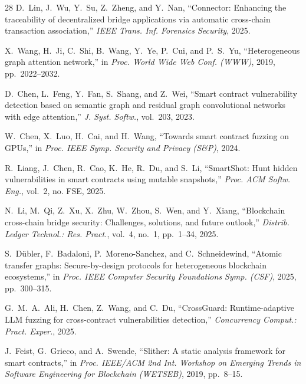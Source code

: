 \documentclass[journal]{IEEEtran}
\begin{document}
\begin{thebibliography}{28}
D.~Lin, J.~Wu, Y.~Su, Z.~Zheng, and Y.~Nan,
``Connector: Enhancing the traceability of decentralized bridge applications via automatic cross-chain transaction association,''
\textit{IEEE Trans. Inf. Forensics Security}, 2025.

X.~Wang, H.~Ji, C.~Shi, B.~Wang, Y.~Ye, P.~Cui, and P.~S.~Yu,
``Heterogeneous graph attention network,''
in \textit{Proc. World Wide Web Conf. (WWW)}, 2019, pp.~2022--2032.

D.~Chen, L.~Feng, Y.~Fan, S.~Shang, and Z.~Wei,
``Smart contract vulnerability detection based on semantic graph and residual graph convolutional networks with edge attention,''
\textit{J. Syst. Softw.}, vol.~203, 2023.

W.~Chen, X.~Luo, H.~Cai, and H.~Wang,
``Towards smart contract fuzzing on GPUs,''
in \textit{Proc. IEEE Symp. Security and Privacy (S\&P)}, 2024.

R.~Liang, J.~Chen, R.~Cao, K.~He, R.~Du, and S.~Li,
``SmartShot: Hunt hidden vulnerabilities in smart contracts using mutable snapshots,''
\textit{Proc. ACM Softw. Eng.}, vol.~2, no. FSE, 2025.

N.~Li, M.~Qi, Z.~Xu, X.~Zhu, W.~Zhou, S.~Wen, and Y.~Xiang,
``Blockchain cross-chain bridge security: Challenges, solutions, and future outlook,''
\textit{Distrib. Ledger Technol.: Res. Pract.}, vol.~4, no.~1, pp.~1--34, 2025.

S.~D\"ubler, F.~Badaloni, P.~Moreno-Sanchez, and C.~Schneidewind,
``Atomic transfer graphs: Secure-by-design protocols for heterogeneous blockchain ecosystems,''
in \textit{Proc. IEEE Computer Security Foundations Symp. (CSF)}, 2025, pp.~300--315.

G.~M.~A.~Ali, H.~Chen, Z.~Wang, and C.~Du,
``CrossGuard: Runtime-adaptive LLM fuzzing for cross-contract vulnerabilities detection,''
\textit{Concurrency Comput.: Pract. Exper.}, 2025.

J.~Feist, G.~Grieco, and A.~Swende,
``Slither: A static analysis framework for smart contracts,''
in \textit{Proc. IEEE/ACM 2nd Int. Workshop on Emerging Trends in Software Engineering for Blockchain (WETSEB)}, 2019, pp.~8--15.

\end{thebibliography}
\end{document}

